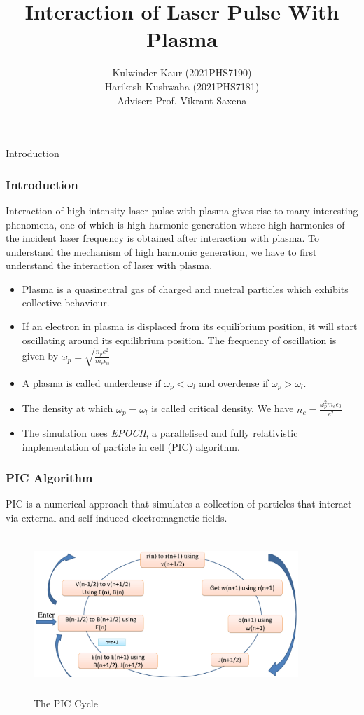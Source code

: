 \documentclass{beamer}
\title[Interaction of Laser Pulse With Plasma]{Interaction of Laser Pulse With Plasma}
\date{}
\institute[IIT Delhi]{\large Indian Institute of Technology, Delhi}
\author[]{Kulwinder Kaur (2021PHS7190)\\ Harikesh Kushwaha (2021PHS7181)\\[3mm]Adviser: Prof. Vikrant Saxena}
\begin{document}
{
\maketitle
\begin{frame}{Introduction}
    \frametitle{Introduction}
    \small
    Interaction of high intensity laser pulse with plasma gives rise to many interesting phenomena, one of which is high harmonic generation where high harmonics of the incident laser frequency is obtained after interaction with plasma. To understand the mechanism of high harmonic generation, we have to first understand the interaction of laser with plasma.\\
    \begin{itemize}
        \item Plasma is a quasineutral gas of charged and nuetral particles which exhibits collective behaviour.
        \item If an electron in plasma is displaced from its equilibrium position, it will start oscillating around its equilibrium position. The frequency of oscillation is given by\cite{chen} $\omega_p = \sqrt{\frac{n_pe^2}{m_e\epsilon_0}}$
        \item A plasma is called underdense if $\omega_p < \omega_l$ and overdense if $\omega_p > \omega_l$.
        \item The density at which $\omega_p = \omega_l$ is called critical density. We have $n_c = \frac{\omega_p^2m_e\epsilon_0}{e^2}$
        \item The simulation uses \textit{EPOCH}\cite{epoch}, a parallelised and fully relativistic implementation of particle in cell
              (PIC) algorithm.
    \end{itemize}
\end{frame}

\begin{frame}
    \small
    \frametitle{PIC Algorithm}
    PIC is a numerical approach that simulates a collection of particles that interact via external and self-induced electromagnetic fields.\cite{suciu}
    \begin{figure}
        \includegraphics[width=10cm, height=6cm]{PIC.png}
        \centering
        \caption{The PIC Cycle}
    \end{figure}


\end{frame}}
\end{document}
